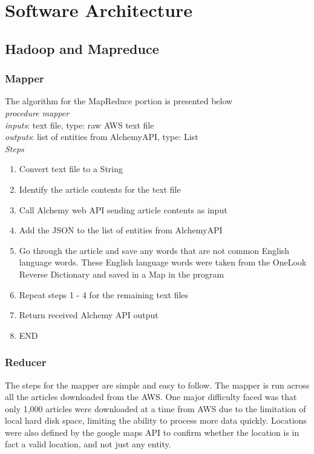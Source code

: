 \documentclass[conference]{IEEEtran}
\begin{document}
\section{Software Architecture}

\subsection{Hadoop and Mapreduce}

\subsubsection{Mapper}

The algorithm for the MapReduce portion is presented below \\

\textit{procedure mapper} \\ 
\textit{inputs}: text file, type: raw AWS text file \\
\textit{outputs}: list of entities from AlchemyAPI, type: List  \\
\textit{Steps} \\
\begin{enumerate}     
\item  Convert text file to a String 
\item Identify the article contents for the text file 
\item Call Alchemy web API sending article contents as input 
\item Add the JSON to the list of entities from AlchemyAPI
\item Go through the article and save any words that are not common English language words. These English language words were taken from the OneLook Reverse Dictionary and saved in a Map in the program 
\item Repeat steps 1 - 4 for the remaining text files
\item Return received Alchemy API output
\item END
\end{enumerate}       

\subsubsection{Reducer}

The steps for the mapper are simple and easy to follow. The mapper is run across all the articles downloaded from the AWS. One major difficulty faced was that only 1,000 articles were downloaded at a time from AWS due to the limitation of local hard disk space, limiting the ability to process more data quickly. Locations were also defined by the google maps API to confirm whether the location is in fact a valid location, and not just any entity. 
\end{document}

